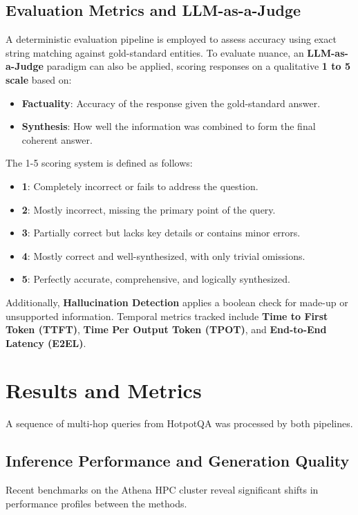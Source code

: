 \documentclass[12pt]{article}
\begin{document}
\subsection{Evaluation Metrics and LLM-as-a-Judge}
A deterministic evaluation pipeline is employed to assess accuracy using exact string matching against gold-standard entities. To evaluate nuance, an \textbf{LLM-as-a-Judge} paradigm can also be applied, scoring responses on a qualitative \textbf{1 to 5 scale} based on:
\begin{itemize}
    \item \textbf{Factuality}: Accuracy of the response given the gold-standard answer.
    \item \textbf{Synthesis}: How well the information was combined to form the final coherent answer.
\end{itemize}
The 1-5 scoring system is defined as follows:
\begin{itemize}
    \item \textbf{1}: Completely incorrect or fails to address the question.
    \item \textbf{2}: Mostly incorrect, missing the primary point of the query.
    \item \textbf{3}: Partially correct but lacks key details or contains minor errors.
    \item \textbf{4}: Mostly correct and well-synthesized, with only trivial omissions.
    \item \textbf{5}: Perfectly accurate, comprehensive, and logically synthesized.
\end{itemize}
Additionally, \textbf{Hallucination Detection} applies a boolean check for made-up or unsupported information. Temporal metrics tracked include \textbf{Time to First Token (TTFT)}, \textbf{Time Per Output Token (TPOT)}, and \textbf{End-to-End Latency (E2EL)}.

\section{Results and Metrics}
A sequence of multi-hop queries from HotpotQA was processed by both pipelines. 

\subsection{Inference Performance and Generation Quality}
Recent benchmarks on the Athena HPC cluster reveal significant shifts in performance profiles between the methods.
\end{document}
